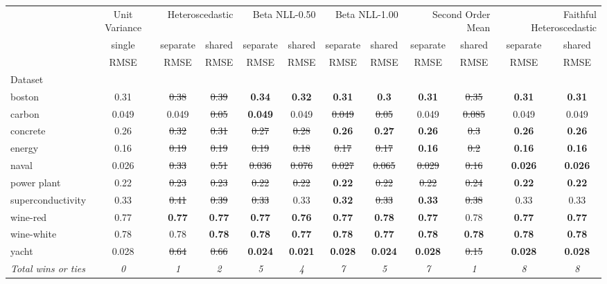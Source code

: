 \begin{tabular}{l|c|cc|cc|cc|cc|cc}
\toprule
{} & {Unit Variance} & \multicolumn{2}{r}{Heteroscedastic} & \multicolumn{2}{r}{Beta NLL-0.50} & \multicolumn{2}{r}{Beta NLL-1.00} & \multicolumn{2}{r}{Second Order Mean} & \multicolumn{2}{r}{Faithful Heteroscedastic} \\
{} & {single} & {separate} & {shared} & {separate} & {shared} & {separate} & {shared} & {separate} & {shared} & {separate} & {shared} \\
{} & {RMSE} & {RMSE} & {RMSE} & {RMSE} & {RMSE} & {RMSE} & {RMSE} & {RMSE} & {RMSE} & {RMSE} & {RMSE} \\
{Dataset} & {} & {} & {} & {} & {} & {} & {} & {} & {} & {} & {} \\
\midrule
boston & 0.31 & \sout{0.38} & \sout{0.39} & \textbf{0.34} & \textbf{0.32} & \textbf{0.31} & \textbf{0.3} & \textbf{0.31} & \sout{0.35} & \textbf{0.31} & \textbf{0.31} \\
carbon & 0.049 & 0.049 & \sout{0.05} & \textbf{0.049} & 0.049 & \sout{0.049} & \sout{0.05} & 0.049 & \sout{0.085} & 0.049 & 0.049 \\
concrete & 0.26 & \sout{0.32} & \sout{0.31} & \sout{0.27} & \sout{0.28} & \textbf{0.26} & \textbf{0.27} & \textbf{0.26} & \sout{0.3} & \textbf{0.26} & \textbf{0.26} \\
energy & 0.16 & \sout{0.19} & \sout{0.19} & \sout{0.19} & \sout{0.18} & \sout{0.17} & \sout{0.17} & \textbf{0.16} & \sout{0.2} & \textbf{0.16} & \textbf{0.16} \\
naval & 0.026 & \sout{0.33} & \sout{0.51} & \sout{0.036} & \sout{0.076} & \sout{0.027} & \sout{0.065} & \sout{0.029} & \sout{0.16} & \textbf{0.026} & \textbf{0.026} \\
power plant & 0.22 & \sout{0.23} & \sout{0.23} & \sout{0.22} & \sout{0.22} & \textbf{0.22} & \sout{0.22} & \sout{0.22} & \sout{0.24} & \textbf{0.22} & \textbf{0.22} \\
superconductivity & 0.33 & \sout{0.41} & \sout{0.39} & \sout{0.33} & 0.33 & \textbf{0.32} & \sout{0.33} & \textbf{0.33} & \sout{0.38} & 0.33 & 0.33 \\
wine-red & 0.77 & \textbf{0.77} & \textbf{0.77} & \textbf{0.77} & \textbf{0.76} & \textbf{0.77} & \textbf{0.78} & \textbf{0.77} & 0.78 & \textbf{0.77} & \textbf{0.77} \\
wine-white & 0.78 & 0.78 & \textbf{0.78} & \textbf{0.78} & \textbf{0.77} & \textbf{0.78} & \textbf{0.77} & \textbf{0.78} & \textbf{0.78} & \textbf{0.78} & \textbf{0.78} \\
yacht & 0.028 & \sout{0.64} & \sout{0.66} & \textbf{0.024} & \textbf{0.021} & \textbf{0.028} & \textbf{0.024} & \textbf{0.028} & \sout{0.15} & \textbf{0.028} & \textbf{0.028} \\
\textit{{Total wins or ties}} & \textit{0} & \textit{1} & \textit{2} & \textit{5} & \textit{4} & \textit{7} & \textit{5} & \textit{7} & \textit{1} & \textit{8} & \textit{8} \\
\bottomrule
\end{tabular}

